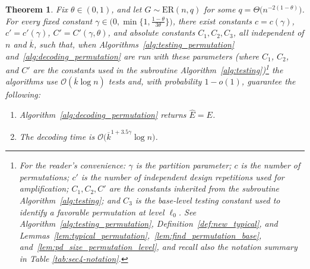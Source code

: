 \documentclass[journal]{IEEEtran}
\newtheorem{theorem}{Theorem}
\theoremstyle{definition}
\theoremstyle{definition}
\newcommand{\ER}{\mathrm{ER}}
\newcommand{\kb}{\overline{k}}
\newcommand{\bigO}{\mathcal{O}}
\begin{document}
\begin{theorem}\label{thm:permutation_method}
Fix \(\theta \in (0,1)\), and let \(G \sim \ER(n,q)\) for some \(q = \Theta\bigl(n^{-2(1-\theta)}\bigr)\). For every fixed constant
\(\gamma \in \bigl(0,\min\{1,\tfrac{1-\theta}{3\theta}\}\bigr)\), there exist constants \(c=c(\gamma)\), \(c'=c'(\gamma)\), \(C'=C'(\gamma,\theta)\), and absolute constants \(C_1,C_2,C_3\), all independent of \(n\) and \(\kb\), such that, when Algorithms~\ref{alg:testing_permutation} and~\ref{alg:decoding_permutation} are run with these parameters (where \(C_1\), \(C_2\), and \(C'\) are the constants
used in the subroutine Algorithm~\ref{alg:testing})\footnote{For the reader’s convenience: \(\gamma\) is the partition
parameter; \(c\) is the number of permutations; \(c'\) is the number of independent design repetitions used for amplification; \(C_1,C_2,C'\) are the constants inherited from the subroutine Algorithm~\ref{alg:testing}; and \(C_3\) is the base-level testing constant used to identify a favorable permutation at level \(\ell_0\). See Algorithm~\ref{alg:testing_permutation}, Definition~\ref{def:new_typical}, and
Lemmas~\ref{lem:typical_permutation},~\ref{lem:find_permutation_base}, and~\ref{lem:pd_size_permutation_level}, and recall also the notation summary in Table \ref{tab:sec4-notation}.} %
the algorithms use \(\bigO(\kb \log n)\) tests and, with probability \(1-o(1)\), guarantee the following:
\begin{enumerate}
  \item Algorithm~\ref{alg:decoding_permutation} returns \(\widehat{E} = E\).
  \item The decoding time is \(\bigO \big( \kb^{1+3.5\gamma} \log n \big)\). %
\end{enumerate}
\end{theorem}
\end{document}
